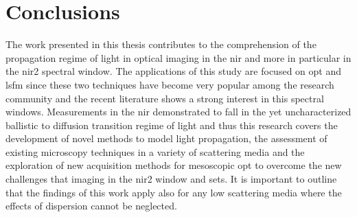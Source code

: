 \chapter*{Conclusions}


The work presented in this thesis contributes to the comprehension of the propagation regime of light in optical imaging in the \gls{nir} and more in particular in the \gls{nir2} spectral window. The applications of this study are focused on \gls{opt} and \gls{lsfm} since these two techniques have become very popular among the research community and the recent literature shows a strong interest in this spectral windows. Measurements in the \gls{nir} demonstrated to fall in the yet uncharacterized ballistic to diffusion transition regime of light and thus this research covers the development of novel methods to model light propagation, the assessment of existing microscopy techniques in a variety of scattering media and the exploration of new acquisition methods for mesoscopic \gls{opt} to overcome the new challenges that imaging in the \gls{nir2} window and sets. It is important to outline that the findings of this work apply also for any low scattering media where the effects of dispersion cannot be neglected.
